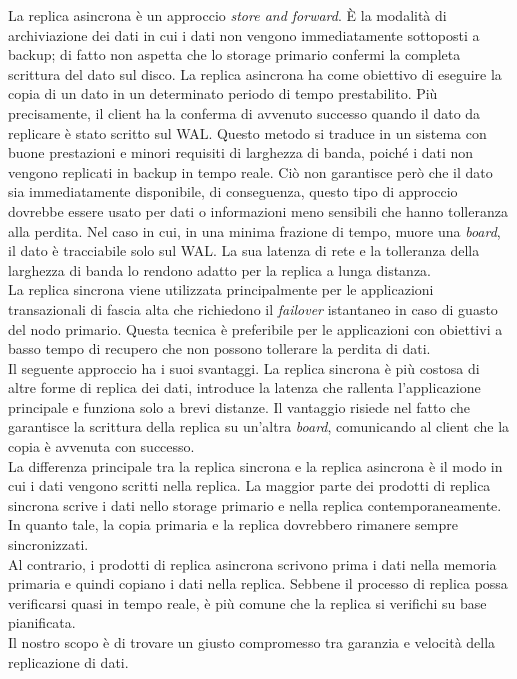 La replica asincrona \`{e} un approccio \textit{store and forward}.
\`{E} la modalit\`{a} di archiviazione dei dati in cui i dati non vengono immediatamente sottoposti a backup; di fatto non aspetta che lo storage primario confermi la completa scrittura del dato sul disco. La replica asincrona ha come obiettivo di eseguire la copia di un dato in un determinato periodo di tempo prestabilito. Pi\`{u} precisamente, il client ha la conferma di avvenuto successo quando il dato da replicare \`{e} stato scritto sul WAL. Questo metodo si traduce in un sistema con buone prestazioni e minori requisiti di larghezza di banda, poich\'{e} i dati non vengono replicati in backup in tempo reale. Ci\`{o} non garantisce per\`{o} che il dato sia immediatamente disponibile, di conseguenza, questo tipo di approccio dovrebbe essere usato per dati o informazioni meno sensibili che hanno tolleranza alla perdita. Nel caso in cui, in una minima frazione di tempo, muore una \textit{board}, il dato \`{e} tracciabile solo sul WAL. La sua latenza di rete e la tolleranza della larghezza di banda lo rendono adatto per la replica a lunga distanza.\\
La replica sincrona viene utilizzata principalmente per le applicazioni transazionali di fascia alta che richiedono il \textit{failover} istantaneo in caso di guasto del nodo primario. 
Questa tecnica \`{e} preferibile per le applicazioni con obiettivi a basso tempo di recupero che non possono tollerare la perdita di dati.\\
Il seguente approccio ha i suoi svantaggi. La replica sincrona \`{e} pi\`{u} costosa di altre forme di replica dei dati, introduce la latenza che rallenta l'applicazione principale e funziona solo a brevi distanze. Il vantaggio risiede nel fatto che garantisce la scrittura della replica su un'altra \textit{board}, comunicando al client che la copia \`{e} avvenuta con successo. \\

La differenza principale tra la replica sincrona e la replica asincrona \`{e} il modo in cui i dati vengono scritti nella replica. La maggior parte dei prodotti di replica sincrona scrive i dati nello storage primario e nella replica contemporaneamente. In quanto tale, la copia primaria e la replica dovrebbero rimanere sempre sincronizzati.\\
Al contrario, i prodotti di replica asincrona scrivono prima i dati nella memoria primaria e quindi copiano i dati nella replica. Sebbene il processo di replica possa verificarsi quasi in tempo reale, \`{e} pi\`{u} comune che la replica si verifichi su base pianificata. \\
Il nostro scopo \`{e} di trovare un giusto compromesso tra garanzia e velocit\`{a} della replicazione di dati.



